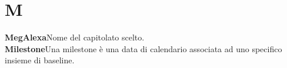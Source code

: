 \newpage
\section{M}\label{l:M}
\textbf{MegAlexa}\newline Nome del capitolato scelto.\\
\newline
\textbf{Milestone}\newline Una milestone è una data di calendario associata ad uno specifico insieme di baseline.